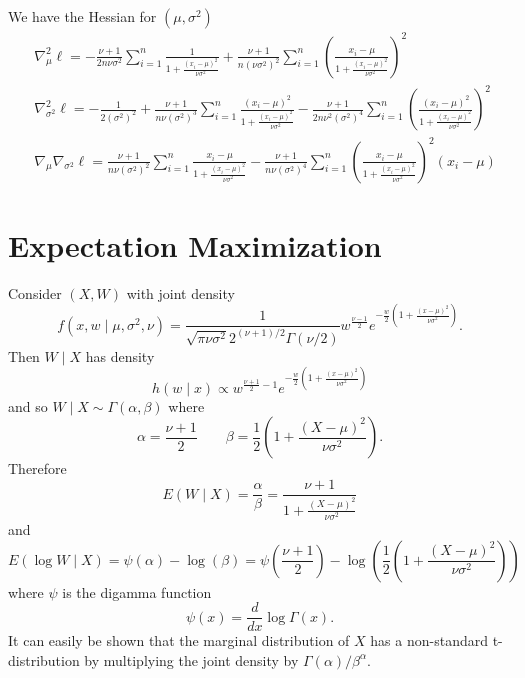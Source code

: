 \documentclass[a4paper,12pt]{article}
\begin{document}
We have the Hessian for $(\mu,\sigma^2)$
\begin{align*}
    &\nabla^{2}_{\mu}\ell = -\frac{\nu + 1}{2n\nu\sigma^2}\sum_{i=1}^{n}\frac{1}{1+\frac{(x_{i}-\mu)^2}{\nu\sigma^2}}+\frac{\nu + 1}{n(\nu\sigma^2)^2}\sum_{i=1}^{n}\left(\frac{x_{i}-\mu}{1 + \frac{(x_{i}-\mu)^2}{\nu\sigma^2}}\right)^2\\
    &\nabla_{\sigma^2}^{2}\ell = -\frac{1}{2(\sigma^2)^2}+\frac{\nu + 1}{n\nu(\sigma^2)^3}\sum_{i=1}^{n}\frac{(x_{i}-\mu)^2}{1 + \frac{(x_{i}-\mu)^2}{\nu\sigma^2}}-\frac{\nu + 1}{2n\nu^2(\sigma^2)^4}\sum_{i=1}^{n}\left(\frac{(x_{i}-\mu)^2}{1 + \frac{(x_{i}-\mu)^2}{\nu\sigma^2}}\right)^2\\
    &\nabla_{\mu}\nabla_{\sigma^2}\ell = \frac{\nu + 1}{n\nu(\sigma^2)^2}\sum_{i=1}^{n}\frac{x_{i} - \mu}{1 + \frac{(x_{i} - \mu)^2}{\nu\sigma^2}}-\frac{\nu + 1}{n\nu(\sigma^2)^4}\sum_{i=1}^{n}\left(\frac{x_{i}-\mu}{1 + \frac{(x_{i}-\mu)^2}{\nu\sigma^2}}\right)^{2}(x_{i}-\mu)
\end{align*}
\section{Expectation Maximization}
Consider $(X, W)$ with joint density
\begin{equation}
    \label{eq:join}
    f(x,w\mid \mu,\sigma^2,\nu)=\frac{1}{\sqrt{\pi\nu\sigma^2}2^{(\nu+1)/2}\Gamma(\nu/2)}w^{\frac{\nu - 1}{2}}e^{-\frac{w}{2}\left(1+\frac{(x -\mu)^2}{\nu\sigma^2}\right)}.
\end{equation}
Then $W\mid X$ has density
\begin{equation}
    h(w\mid x)\propto w^{\frac{\nu + 1}{2} - 1}e^{-\frac{w}{2}\left(1+\frac{(x -\mu)^2}{\nu\sigma^2}\right)}
\end{equation}
and so $W\mid X \sim \Gamma(\alpha, \beta)$ where
\begin{equation}
    \alpha = \frac{\nu + 1}{2} \quad\quad 
    \beta = \frac{1}{2}\left(1+\frac{(X -\mu)^2}{\nu\sigma^2}\right).
\end{equation}
Therefore
\begin{equation}
    E(W\mid X) = \frac{\alpha}{\beta} = \frac{\nu + 1}{1+\frac{(X -\mu)^2}{\nu\sigma^2}}
\end{equation}
and
\begin{equation}
    E(\log W \mid X)=\psi(\alpha)-\log(\beta)=\psi\left(\frac{\nu + 1}{2}\right)-\log\left(\frac{1}{2}\left(1+\frac{(X - \mu)^2}{\nu\sigma^2}\right)\right)
\end{equation}
where $\psi$ is the digamma function
\begin{equation}
    \psi(x) = \frac{d}{dx}\log\Gamma(x).
\end{equation}
It can easily be shown that the marginal distribution of $X$ has a non-standard t-distribution by multiplying the joint density by $\Gamma(\alpha)/\beta^{\alpha}$.
\end{document}
